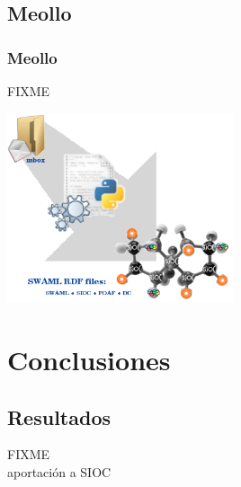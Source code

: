 \documentclass[spanish,notes=hide]{beamer}
\begin{document}
\subsection{Meollo}
\frame
{
  \frametitle{Meollo}

  FIXME

  \begin{center}
	\includegraphics[width=0.5\textwidth]{images/swaml.png}
  \end{center}
}

\section{Conclusiones}
\subsection{Resultados}
\frame
{
  FIXME\\
  aportación a SIOC
}
\end{document}
